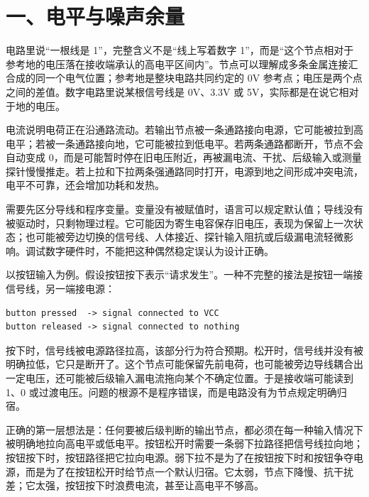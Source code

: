 \section{一、电平与噪声余量}

电路里说“一根线是 1”，完整含义不是“线上写着数字 1”，而是“这个节点相对于参考地的电压落在接收端承认的高电平区间内”。节点可以理解成多条金属连接汇合成的同一个电气位置；参考地是整块电路共同约定的 0V 参考点；电压是两个点之间的差值。数字电路里说某根信号线是 0V、3.3V 或 5V，实际都是在说它相对于地的电压。

电流说明电荷正在沿通路流动。若输出节点被一条通路接向电源，它可能被拉到高电平；若被一条通路接向地，它可能被拉到低电平。若两条通路都断开，节点不会自动变成 0，而是可能暂时停在旧电压附近，再被漏电流、干扰、后级输入或测量探针慢慢推走。若上拉和下拉两条强通路同时打开，电源到地之间形成冲突电流，电平不可靠，还会增加功耗和发热。

需要先区分导线和程序变量。变量没有被赋值时，语言可以规定默认值；导线没有被驱动时，只剩物理过程。它可能因为寄生电容保存旧电压，表现为保留上一次状态；也可能被旁边切换的信号线、人体接近、探针输入阻抗或后级漏电流轻微影响。调试数字硬件时，不能把这种偶然稳定误认为设计正确。

以按钮输入为例。假设按钮按下表示“请求发生”。一种不完整的接法是按钮一端接信号线，另一端接电源：

\begin{lstlisting}
button pressed  -> signal connected to VCC
button released -> signal connected to nothing
\end{lstlisting}

按下时，信号线被电源路径拉高，该部分行为符合预期。松开时，信号线并没有被明确拉低，它只是断开了。这个节点可能保留先前电荷，也可能被旁边导线耦合出一定电压，还可能被后级输入漏电流拖向某个不确定位置。于是接收端可能读到 1、0 或过渡电压。问题的根源不是程序错误，而是电路没有为节点规定明确归宿。

正确的第一层想法是：任何要被后级判断的输出节点，都必须在每一种输入情况下被明确地拉向高电平或低电平。按钮松开时需要一条弱下拉路径把信号线拉向地；按钮按下时，按钮路径把它拉向电源。弱下拉不是为了在按钮按下时和按钮争夺电源，而是为了在按钮松开时给节点一个默认归宿。它太弱，节点下降慢、抗干扰差；它太强，按钮按下时浪费电流，甚至让高电平不够高。

